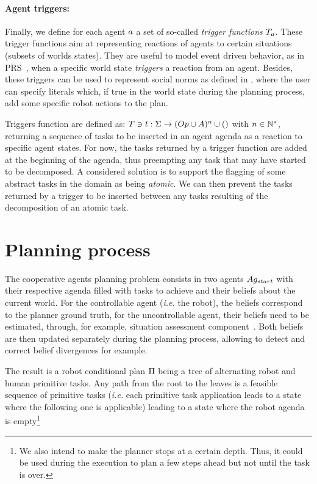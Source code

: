 \documentclass[a4paper,11pt,twoside]{StyleThese}
\begin{document}
\paragraph{\bf Agent triggers:}
Finally, we define for each agent $a$ a set of so-called \textit{trigger functions} $T_{a}$. These trigger functions aim at representing reactions of agents to certain situations (subsets of worlds states). They are useful to model event driven behavior, as in PRS~\cite{ingrand1996prs}, when a specific world state \textit{triggers} a reaction from an agent. Besides, these triggers can be used to represent social norms as defined in \cite{carlucci2015explicit}, where the user can specify literals which, if true in the world state during the planning process, add some specific robot actions to the plan.

Triggers function are defined as: $T \ni t: \Sigma \rightarrow (Op \cup A)^n \cup ()$ with $n \in \mathbb{N}^*$, returning a sequence of tasks to be inserted in an agent agenda as a reaction to specific agent states. For now, the tasks returned by a trigger function are added at the beginning of the agenda, thus preempting any task that may have started to be decomposed. A considered solution is to support the flagging of some abstract tasks in the domain as being \textit{atomic}. We can then prevent the tasks returned by a trigger to be inserted between any tasks resulting of the decomposition of an atomic task.

\section{Planning process}
The cooperative agents planning problem consists in two agents $Ag_{start}$ with their respective agenda filled with tasks to achieve and their beliefs about the current world. For the controllable agent (\textit{i.e.} the robot), the beliefs correspond to the planner ground truth, for the uncontrollable agent, their beliefs need to be estimated, through, for example, situation assessment component~\cite{milliez2014framework, lemaignan2018underworlds}. Both beliefs are then updated separately during the planning process, allowing to detect and correct belief divergences for example. 

The result is a robot conditional plan $\Pi$ being a tree of alternating robot and human primitive tasks. Any path from the root to the leaves is a feasible sequence of primitive tasks (\textit{i.e.} each primitive task application leads to a state where the following one is applicable) leading to a state where the robot agenda is empty\footnote{We also intend to make the planner stops at a certain depth. Thus, it could be used during the execution to plan a few steps ahead but not until the task is over.}
\end{document}
